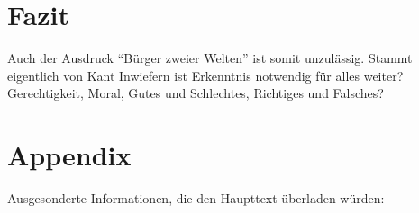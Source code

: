 \documentclass[12pt]{article}
\newcommand*{\zitatblock}[1]{%
    \begin{quote}
    \fontsize{10}{12}\selectfont
    \setlength{\parskip}{1.0em}
    #1
    \end{quote}
}
\begin{document}
\section{Fazit}
Auch der Ausdruck \enquote{Bürger zweier Welten} ist somit unzulässig. Stammt eigentlich von Kant
Inwiefern ist Erkenntnis notwendig für alles weiter? Gerechtigkeit, Moral, Gutes und Schlechtes, Richtiges und Falsches? 
\newpage
\nocite{politeia}
\nocite{Parmenides}
\section{Appendix}
Ausgesonderte Informationen, die den Haupttext überladen würden:\\
\end{document}
